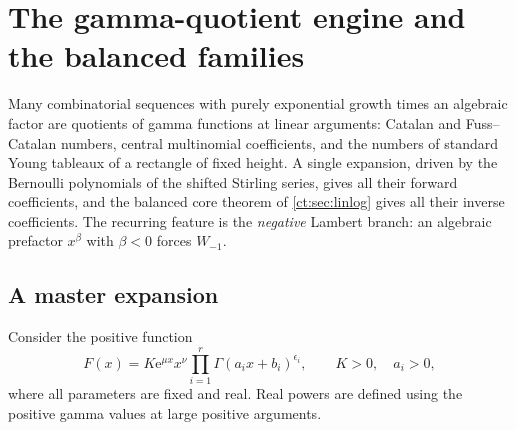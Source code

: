 \documentclass[11pt,openany]{book}
\numberwithin{equation}{chapter}
\theoremstyle{plain}
\theoremstyle{definition}
\theoremstyle{remark}
\newcommand{\ee}{\mathrm e}
\begin{document}
\chapter{The gamma-quotient engine and the balanced families}
\label{ct:ch:gamma}

Many combinatorial sequences with purely exponential growth times an
algebraic factor are quotients of gamma functions at linear arguments:
Catalan and Fuss--Catalan numbers, central multinomial coefficients, and
the numbers of standard Young tableaux of a rectangle of fixed height.  A
single expansion, driven by the Bernoulli polynomials of the shifted
Stirling series, gives all their forward coefficients, and the balanced
core theorem of \cref{ct:sec:linlog} gives all their inverse coefficients.
The recurring feature is the \emph{negative} Lambert branch: an algebraic
prefactor $x^{\beta}$ with $\beta<0$ forces $W_{-1}$.

\section{A master expansion}

Consider the positive function
\begin{equation}
 F(x)=K\ee^{\mu x}x^\nu
       \prod_{i=1}^r\Gamma(a_ix+b_i)^{\epsilon_i},
 \qquad K>0,\quad a_i>0,
 \label{t2:eq:gamma-general}
\end{equation}
where all parameters are fixed and real. Real powers are defined using the positive gamma values at large positive arguments.
\end{document}
